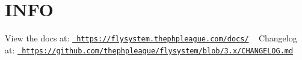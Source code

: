 \chapter{INFO}
\hypertarget{md_vendor_2league_2flysystem_2_i_n_f_o}{}\label{md_vendor_2league_2flysystem_2_i_n_f_o}
View the docs at\+: \href{https://flysystem.thephpleague.com/docs/}{\texttt{ https\+://flysystem.\+thephpleague.\+com/docs/}} ~\newline
 Changelog at\+: \href{https://github.com/thephpleague/flysystem/blob/3.x/CHANGELOG.md}{\texttt{ https\+://github.\+com/thephpleague/flysystem/blob/3.\+x/\+CHANGELOG.\+md}} 
